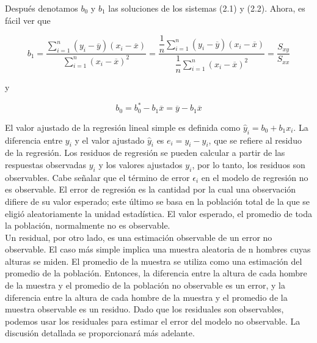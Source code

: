 Después denotamos $b_0$ y $b_1$ las soluciones de los sistemas (2.1) y (2.2). Ahora, es fácil ver que
\begin{tcolorbox}
    \begin{equation}
	b_1=\dfrac{\sum\limits_{i=1}^n (y_i-\overline{y})(x_i-\overline{x})}{\sum\limits_{i=1}^n (x_i-\overline{x})^2}=\dfrac{\dfrac{1}{n}\sum\limits_{i=1}^n (y_i-\overline{y})(x_i-\overline{x})}{\dfrac{1}{n}\sum\limits_{i=1}^n (x_i-\overline{x})^2}=\dfrac{S_{xy}}{S_{xx}}
    \end{equation}
\end{tcolorbox}

y

\begin{tcolorbox}
    \begin{equation}
	b_0=b_0^*-b_1\overline{x}=\overline{y}-b_1\overline{x}
    \end{equation}
\end{tcolorbox}
\vspace{0.5cm}

El valor ajustado de la regresión lineal simple es definida como $\hat{y}_i=b_0+b_1x_i.$ La diferencia entre $y_i$ y el valor ajustado $\hat{y}_i$ es $e_i=y_i-\hat{y}_i$, que se refiere al residuo de la regresión. Los residuos de regresión se pueden calcular a partir de las respuestas observadas $y_i$ y los valores ajustados $y_i$, por lo tanto, los residuos son observables. Cabe señalar que el término de error $\epsilon_i$ en el modelo de regresión no es observable. El error de regresión es la cantidad por la cual una observación difiere de su valor esperado; este último se basa en la población total de la que se eligió aleatoriamente la unidad estadística. El valor esperado, el promedio de toda la población, normalmente no es observable.\\

Un residual, por otro lado, es una estimación observable de un error no observable. El caso más simple implica una muestra aleatoria de n hombres cuyas alturas se miden. El promedio de la muestra se utiliza como una estimación del promedio de la población. Entonces, la diferencia entre la altura de cada hombre de la muestra y el promedio de la población no observable es un error, y la diferencia entre la altura de cada hombre de la muestra y el promedio de la muestra observable es un residuo. Dado que los residuales son observables, podemos usar los residuales para estimar el error del modelo no observable. La discusión detallada se proporcionará más adelante.

